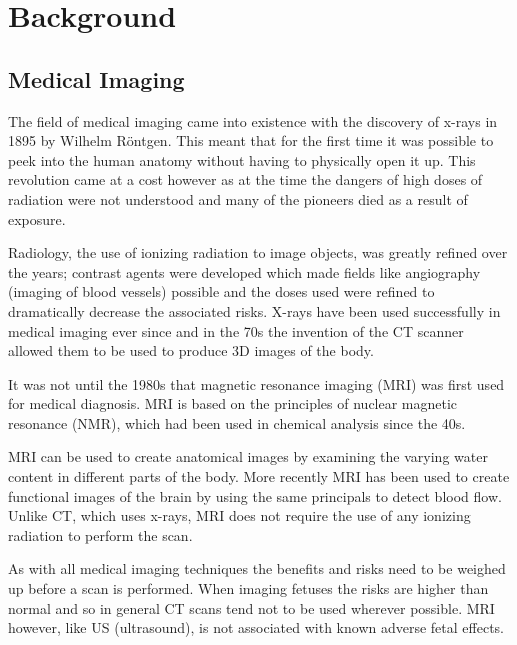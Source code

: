\chapter{Background}

\section{Medical Imaging}\label{background:medicalimaging}
The field of medical imaging came into existence with the discovery of x-rays in 1895 by Wilhelm R\"{o}ntgen\cite{rontgen}. This meant that for the first time it was possible to peek into the human anatomy without having to physically open it up. This revolution came at a cost however as at the time the dangers of high doses of radiation were not understood and many of the pioneers died as a result of exposure\cite{xraydeath}.

Radiology, the use of ionizing radiation to image objects, was greatly refined over the years; contrast agents were developed which made fields like angiography (imaging of blood vessels) possible\cite{infinityhistory} and the doses used were refined to dramatically decrease the associated risks. X-rays have been used successfully in medical imaging ever since and in the 70s the invention of the CT scanner allowed them to be used to produce 3D images of the body.

It was not until the 1980s that magnetic resonance imaging (MRI) was first used for medical diagnosis. MRI is based on the principles of nuclear magnetic resonance (NMR), which had been used in chemical analysis since the 40s\cite{bshr:mallard}.

MRI can be used to create anatomical images by examining the varying water content in different parts of the body. More recently MRI has been used to create functional images of the brain by using the same principals to detect blood flow\cite{fmri}. Unlike CT, which uses x-rays, MRI does not require the use of any ionizing radiation to perform the scan.

As with all medical imaging techniques the benefits and risks need to be weighed up before a scan is performed. When imaging fetuses the risks are higher than normal and so in general CT scans tend not to be used wherever possible. MRI however, like US (ultrasound), is not associated with known adverse fetal effects.\cite{pregnancyimagingguidelines}

\newpage
